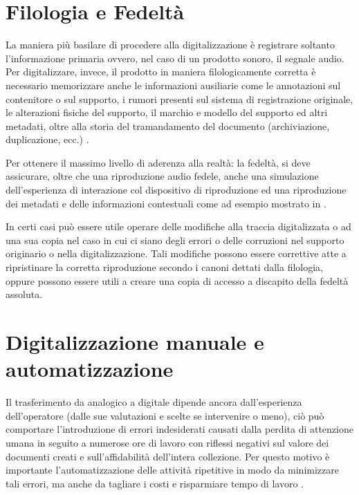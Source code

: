 \section{Filologia e Fedeltà} \label{sec:filologia-fedeltà}
La maniera più basilare di procedere alla digitalizzazione è registrare soltanto l'informazione primaria ovvero, nel caso di un prodotto sonoro, il segnale audio.
Per digitalizzare, invece, il prodotto in maniera filologicamente corretta è necessario memorizzare anche le informazioni ausiliarie come le annotazioni sul contenitore o sul supporto, i rumori presenti sul sistema di registrazione originale, le alterazioni fisiche del supporto, il marchio e modello del supporto ed altri metadati, oltre alla storia del tramandamento del documento (archiviazione, duplicazione, ecc.) \cite[p. 59]{prettoComputingMethodologiesSupporting2018}.

Per ottenere il massimo livello di aderenza alla realtà: la fedeltà, si deve assicurare, oltre che una riproduzione audio fedele, anche una simulazione dell'esperienza di interazione col dispositivo di riproduzione ed una riproduzione dei metadati e delle informazioni contestuali come ad esempio mostrato in \textcite[cap. 3]{fantozziTapeMusicArchives2017}.

In certi casi può essere utile operare delle modifiche alla traccia digitalizzata o ad una sua copia nel caso in cui ci siano degli errori o delle corruzioni nel supporto originario o nella digitalizzazione. Tali modifiche possono essere correttive atte a ripristinare la corretta riproduzione secondo i canoni dettati dalla filologia, oppure possono essere utili a creare una copia di accesso a discapito della fedeltà assoluta.


\section{Digitalizzazione manuale e automatizzazione} \label{sec:digitalizzazione-man-vs-auto}
Il trasferimento da analogico a digitale dipende ancora dall'esperienza dell'operatore (dalle sue valutazioni e scelte se intervenire o meno), ciò può comportare l'introduzione di errori indesiderati causati dalla perdita di attenzione umana in seguito a numerose ore di lavoro con riflessi negativi sul valore dei documenti creati e sull'affidabilità dell'intera collezione.
Per questo motivo è importante l'automatizzazione delle attività ripetitive in modo da minimizzare tali errori, ma anche da tagliare i costi e risparmiare tempo di lavoro \cites[cap. 2.1]{fantozziTapeMusicArchives2017}[es. 5]{mpaiApplicationNoteRev}.


